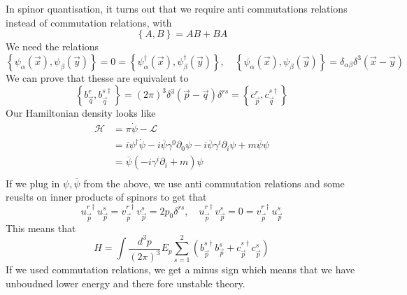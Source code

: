 In spinor quantisation, it turns out that we require 
anti commutations relations instead of commutation relations, with 
\[
 \left\{  A, B  \right\}   = AB + B A 
\]  We need the relations 
\[
	\left\{  \psi _ \alpha ( \vec{x} ) , \psi _ \beta ( \vec{y} )  \right\}   = 0 
	= \left\{  \psi _{ \alpha } ^ \dagger ( \vec{x} ) , \psi _{ \beta } ^ \dagger 
	( \vec{y} ) \right\}  , \quad \left\{  \psi _ \alpha ( \vec{x} ) , 
\psi _{ \beta } ( \vec{y} ) \right\}  = \delta _{ \alpha \beta } \delta ^ 3 ( \vec{x} - \vec{y} ) 
\]
We can prove that thesse are equivalent to 
\[
 \left\{  b_{ \vec{q} } ^ r , b _{ \vec{q} } ^{ s \dagger }  \right\}  = 
 ( 2 \pi ) ^ 3 \delta ^ 3 ( \vec{p} - \vec{q} ) \delta ^{ rs }  = \left\{  c_{ \vec{p} } ^ r , 
 c _{ \vec{q} } ^{ s \dagger }\right\} 
\] Our Hamiltonian density looks like 
\begin{align*}
	\mathcal{ H } &=  \pi \dot{ \psi }  - \mathcal{ L }   \\
	&=  i \psi ^ \dagger \dot{ \psi }  - i \overline{ \psi } \gamma ^ 0 \partial  _ 0 
	\psi - i \overline{ \psi } \gamma ^ i \partial  _ i \psi + m \overline{ \psi } \psi \\
	&=  \overline{ \psi }( - i \gamma ^ i \partial  _ i + m ) \psi   \\ 
\end{align*}
If we plug in $ \psi , \overline{ \psi } $ from the above, 
we use anti commutation relations and some reuslts on inner 
products of spinors to get that 
\[
 u _{ \vec{p} } ^{ r \dagger } u _{ \vec{p} } ^ s  = 
 v_{\vec{p} } ^{ r \dagger } v _{ \vec{p} } ^ s  = 2 p_0 \delta ^{ rs } , \quad 
 u_{\vec{p} } ^{  r\dagger } v_{\vec{p} } ^ s = 0 = v_{ \vec{p} } ^{ r \dagger  } u_{ \vec{p} } ^ s 
\] 
This means that 
\[
	H = \int \frac{ d^ 3 p }{ ( 2 \pi ) ^ 3 } E _ p \sum_{ s = 1 } ^ 2 
	\left(  b_{ \vec{p} } ^{ s \dagger  } b _{ \vec{p} } ^ s 
	+ c _{ \vec{p} } ^{ s \dagger } c _{ \vec{p} } ^ s \right) 
\] If we used commutation relations, we get a minus sign which means that we 
have unboudned lower energy and there fore unstable theory. 
